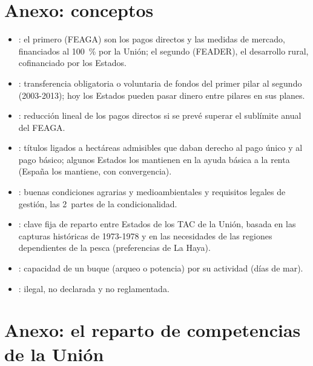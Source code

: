 \documentclass[11pt]{article}
\begin{document}
\section{Anexo: conceptos}\label{anexo:conceptos}

\begin{itemize}
\item {}: el primero (FEAGA) son los pagos directos y las medidas de mercado, financiados al 100~\% por la Unión; el segundo (FEADER), el desarrollo rural, cofinanciado por los Estados.
\item {}: transferencia obligatoria o voluntaria de fondos del primer pilar al segundo (2003-2013); hoy los Estados pueden pasar dinero entre pilares en sus planes.
\item {}: reducción lineal de los pagos directos si se prevé superar el sublímite anual del FEAGA.
\item {}: títulos ligados a hectáreas admisibles que daban derecho al pago único y al pago básico; algunos Estados los mantienen en la ayuda básica a la renta (España los mantiene, con convergencia).
\item {}: buenas condiciones agrarias y medioambientales y requisitos legales de gestión, las 2~partes de la condicionalidad.
\item {}: clave fija de reparto entre Estados de los TAC de la Unión, basada en las capturas históricas de 1973-1978 y en las necesidades de las regiones dependientes de la pesca (preferencias de La Haya).
\item {}: capacidad de un buque (arqueo o potencia) por su actividad (días de mar).
\item {}: ilegal, no declarada y no reglamentada.
\end{itemize}

\section{Anexo: el reparto de competencias\cortetitulo{} de la Unión}\label{anexo:competencias}
\end{document}
